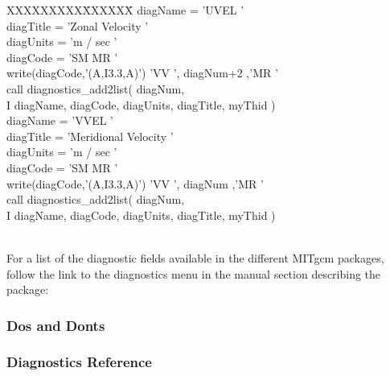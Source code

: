 \noindent
\begin{tabbing}
XXXXXXXXX\=XXXXXX\= \kill
\>      diagName  = 'UVEL    ' \\
\>      diagTitle = 'Zonal Velocity                ' \\
\>      diagUnits = 'm / sec         ' \\
\>      diagCode  = 'SM      MR      ' \\
\>      write(diagCode,'(A,I3.3,A)') 'VV   ', diagNum+2 ,'MR      ' \\
\>      call diagnostics\_add2list( diagNum, \\
\>     I          diagName, diagCode, diagUnits, diagTitle, myThid ) \\
\>      diagName  = 'VVEL    ' \\
\>      diagTitle = 'Meridional Velocity           ' \\
\>      diagUnits = 'm / sec         ' \\
\>      diagCode  = 'SM      MR      ' \\
\>      write(diagCode,'(A,I3.3,A)') 'VV   ', diagNum ,'MR      ' \\
\>      call diagnostics\_add2list( diagNum, \\
\>     I          diagName, diagCode, diagUnits, diagTitle, myThid ) \\
\\
\end{tabbing}



\newpage
\noindent For a list of the diagnostic fields available in the
different MITgcm packages, follow the link to the diagnostics menu
in the manual section describing the package:


\subsubsection{Dos and Donts}

\subsubsection{Diagnostics Reference}

